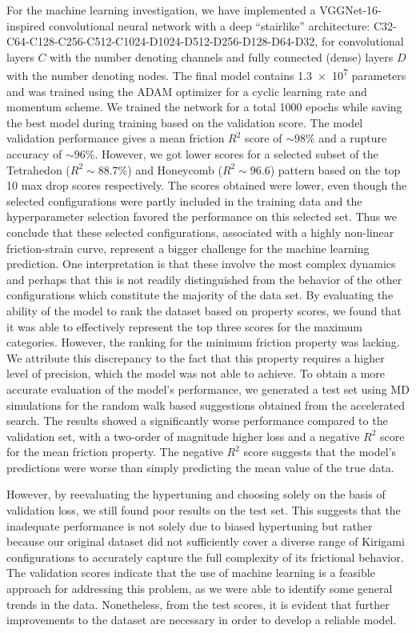 For the machine learning investigation, we have implemented a VGGNet-16-inspired
convolutional neural network with a deep ``stairlike'' architecture:
C32-C64-C128-C256-C512-C1024-D1024-D512-D256-D128-D64-D32, for convolutional
layers $C$ with the number denoting channels and fully connected (dense) layers
$D$ with the number denoting nodes. The final model contains \num{1.3e7}
parameters and was trained using the ADAM optimizer for a cyclic learning rate
and momentum scheme. We trained the network for a total 1000 epochs while saving
the best model during training based on the validation score. The model
validation performance gives a mean friction $R^2$ score of $\sim 98\%$ and a
rupture accuracy of $\sim 96 \%$. However, we got lower scores for a selected
subset of the Tetrahedon ($R^2 \sim 88.7 \%$) and Honeycomb ($R^2 \sim 96.6$)
pattern based on the top 10 max drop scores respectively. The scores obtained
were lower, even though the selected configurations were partly included in the
training data and the hyperparameter selection favored the performance on this
selected set. Thus we conclude that these selected configurations, associated
with a highly non-linear friction-strain curve, represent a bigger challenge for
the machine learning prediction. One interpretation is that these involve the
most complex dynamics and perhaps that this is not readily distinguished from
the behavior of the other configurations which constitute the majority of the
data set. By evaluating the ability of the model to rank the dataset based on
property scores, we found that it was able to effectively represent the top
three scores for the maximum categories. However, the ranking for the minimum
friction property was lacking. We attribute this discrepancy to the fact that
this property requires a higher level of precision, which the model was not able
to achieve. To obtain a more accurate evaluation of the model's performance, we
generated a test set using \acrshort{MD} simulations for the random walk based
suggestions obtained from the accelerated search. The results showed a
significantly worse performance compared to the validation set, with a two-order
of magnitude higher loss and a negative $R^2$ score for the mean friction
property. The negative $R^2$ score suggests that the model's predictions were
worse than simply predicting the mean value of the true data.

However, by reevaluating the hypertuning and choosing solely on the basis of
validation loss, we still found poor results on the test set. This suggests that
the inadequate performance is not solely due to biased hypertuning but rather
because our original dataset did not sufficiently cover a diverse range of
Kirigami configurations to accurately capture the full complexity of its
frictional behavior. The validation scores indicate that the use of machine
learning is a feasible approach for addressing this problem, as we were able to
identify some general trends in the data. Nonetheless, from the test scores, it
is evident that further improvements to the dataset are necessary in order to
develop a reliable model.


